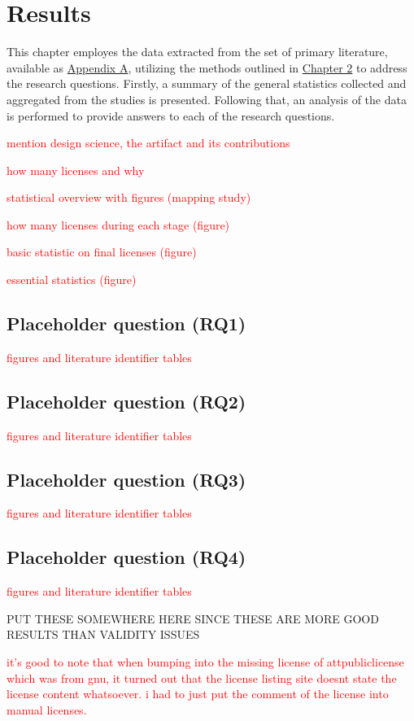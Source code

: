 \chapter{Results\label{results}}
This chapter employes the data extracted from the set of primary literature, available as \hyperref[appendix:a]{Appendix A}, utilizing the methods outlined in \hyperref[methods]{Chapter 2} to address the research questions. Firstly, a summary of the general statistics collected and aggregated from the studies is presented. Following that, an analysis of the data is performed to provide answers to each of the research questions.

\textcolor{red}{mention design science, the artifact and its contributions}

\textcolor{red}{how many licenses and why}

\textcolor{red}{statistical overview with figures (mapping study)}

\textcolor{red}{how many licenses during each stage (figure)}

\textcolor{red}{basic statistic on final licenses (figure)}

\textcolor{red}{essential statistics (figure)}

\section{Placeholder question (RQ1)}
\textcolor{red}{figures and literature identifier tables}
\section{Placeholder question (RQ2)}
\textcolor{red}{figures and literature identifier tables}
\section{Placeholder question (RQ3)}
\textcolor{red}{figures and literature identifier tables}
\section{Placeholder question (RQ4)}
\textcolor{red}{figures and literature identifier tables}

PUT THESE SOMEWHERE HERE SINCE THESE ARE MORE GOOD RESULTS THAN VALIDITY ISSUES 

\textcolor{red}{it's good to note that when bumping into the missing license of attpubliclicense which was from gnu, it turned out that the license listing site doesnt state the license content whatsoever. i had to just put the comment of the license into manual licenses.}


